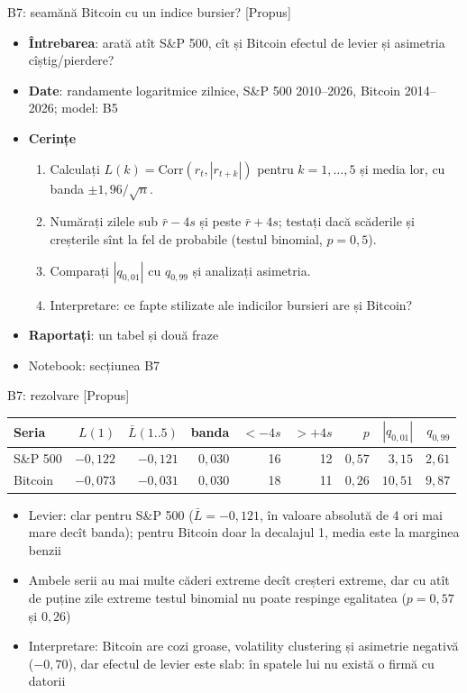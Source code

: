 \begin{frame}{B7: seamănă Bitcoin cu un indice bursier? [Propus]}
\itemsize{\footnotesize}
\begin{itemize}
\item \textbf{Întrebarea}: arată atît S\&P 500, cît și Bitcoin efectul de levier și asimetria cîștig/pierdere?
\item \textbf{Date}: randamente logaritmice zilnice, S\&P 500 2010--2026, Bitcoin 2014--2026; model: B5
\item \textbf{Cerințe}
\begin{enumerate}
    \item Calculați $L(k) = \text{Corr}(r_t, |r_{t+k}|)$ pentru $k = 1, \dots, 5$ și media lor, cu banda $\pm 1{,}96/\sqrt n$.
    \item Numărați zilele sub $\bar r - 4s$ și peste $\bar r + 4s$; testați dacă scăderile și creșterile sînt la fel de probabile (testul binomial, $p = 0{,}5$).
    \item Comparați $|q_{0{,}01}|$ cu $q_{0{,}99}$ și analizați asimetria.
    \item Interpretare: ce fapte stilizate ale indicilor bursieri are și Bitcoin?
\end{enumerate}
\item \textbf{Raportați}: un tabel și două fraze
\item Notebook: secțiunea B7
\end{itemize}
\end{frame}

\ifsolutions
\begin{frame}{B7: rezolvare [Propus]}
\itemsize{\footnotesize}
\begin{center}
\footnotesize
\begin{tabular}{lrrrrrrrr}
\toprule
Seria & $L(1)$ & $\bar L(1..5)$ & banda & $< -4s$ & $> +4s$ & $p$ & $|q_{0{,}01}|$ & $q_{0{,}99}$ \\
\midrule
S\&P 500 & $-0{,}122$ & $-0{,}121$ & $0{,}030$ & 16 & 12 & $0{,}57$ & $3{,}15$ & $2{,}61$ \\
Bitcoin & $-0{,}073$ & $-0{,}031$ & $0{,}030$ & 18 & 11 & $0{,}26$ & $10{,}51$ & $9{,}87$ \\
\bottomrule
\end{tabular}
\end{center}
\begin{itemize}
    \item Levier: clar pentru S\&P 500 ($\bar L = -0{,}121$, în valoare absolută de 4 ori mai mare decît banda); pentru Bitcoin doar la decalajul 1, media este la marginea benzii
    \item Ambele serii au mai multe căderi extreme decît creșteri extreme, dar cu atît de puține zile extreme testul binomial nu poate respinge egalitatea ($p = 0{,}57$ și $0{,}26$)
    \item Interpretare: Bitcoin are cozi groase, volatility clustering și asimetrie negativă ($-0{,}70$), dar efectul de levier este slab: în spatele lui nu există o firmă cu datorii
\end{itemize}
\end{frame}
\fi


